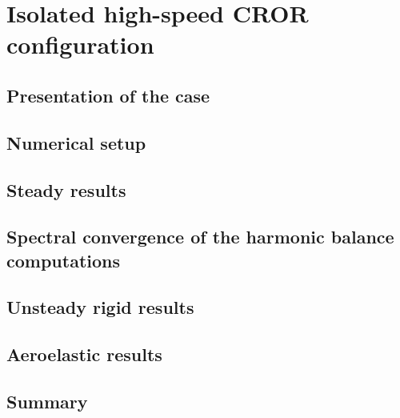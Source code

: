 \chapter{Isolated high-speed CROR configuration}
\label{cha:dream_hs_isolated}

\chabstract{}


\newpage

\section{Presentation of the case}
\label{sec:dream_hs_presentation}


\section{Numerical setup}
\label{sec:dream_hs_numerical}


\section{Steady results}
\label{sec:dream_hs_steady_results}


\section{Spectral convergence of the harmonic balance computations}
\label{sec:dream_hs_spectral_convergence}


\section{Unsteady rigid results}
\label{sec:dream_hs_rigid_results}


\section{Aeroelastic results}
\label{sec:dream_hs_ael_results}


\section*{Summary}
